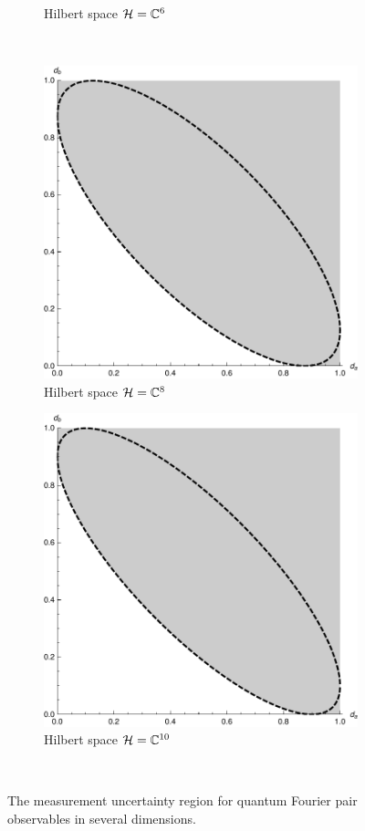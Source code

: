 \begin{figure}
\begin{subfigure}[t]{0.4\textwidth}
    \caption{Hilbert space $\mathcal{H} = \mathbb{C}^6$}
  \end{subfigure}\\
  \begin{subfigure}[t]{0.4\textwidth}
    \includegraphics[width=\textwidth]{fourier-ur-8}
    \caption{Hilbert space $\mathcal{H} = \mathbb{C}^8$}
  \end{subfigure}\quad
  \begin{subfigure}[t]{0.4\textwidth}
    \includegraphics[width=\textwidth]{fourier-ur-10}
    \caption{Hilbert space $\mathcal{H} = \mathbb{C}^{10}$}
  \end{subfigure}\\
  \caption{The measurement uncertainty region for quantum Fourier pair observables in several dimensions.}
\end{figure}

